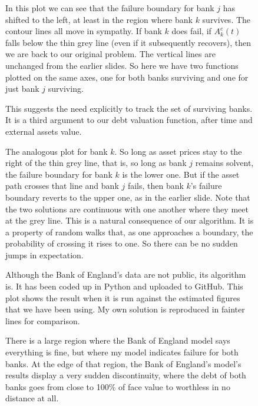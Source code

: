 \documentclass[a4paper,11pt]{article}
\newcommand{\ass}[2]{A^{e}_{#1}(#2)}
\begin{document}
  \begin{figure}[H]
    \begin{center}
    \end{center}
    \ttfamily
    In this plot we can see that the failure boundary for bank $j$ has shifted to the left, at least in the region where bank $k$ survives.
    The contour lines all move in sympathy.
    If bank $k$ does fail, if $\ass{k}{t}$ falls below the thin grey line (even if it subsequently recovers), then we are back to our original problem.
    The vertical lines are unchanged from the earlier slides.
    So here we have two functions plotted on the same axes, one for both banks surviving and one for just bank $j$ surviving.

    This suggests the need explicitly to track the set of surviving banks.
    It is a third argument to our debt valuation function, after time and external assets value.
  \end{figure}
  \begin{figure}[H]
    \begin{center}
    \end{center}
    \ttfamily
    The analogous plot for bank $k$. So long as asset prices stay to the right of the thin grey line,
    that is, so long as bank $j$ remains solvent,
    the failure boundary for bank $k$ is the lower one.
    But if the asset path crosses that line and bank $j$ fails, then bank $k$'s failure boundary reverts to the upper one, as in the earlier slide.
    Note that the two solutions are continuous with one another where they meet at the grey line.
    This is a natural consequence of our algorithm. It is a property of random walks that,
    as one approaches a boundary, the probability of crossing it rises to one.
    So there can be no sudden jumps in expectation.
  \end{figure}
  \begin{figure}[H]
    \begin{center}
    \end{center}
    \ttfamily
    Although the Bank of England's data are not public, its algorithm is.
    It has been coded up in Python and uploaded to GitHub.
    This plot shows the result when it is run against the estimated figures that we have been using.
    My own solution is reproduced in fainter lines for comparison.

    There is a large region where the Bank of England model says everything is fine, but where my model indicates failure for both banks.
    At the edge of that region, the Bank of England's model's results display a very sudden discontinuity,
    where the debt of both banks goes from close to 100\% of face value to worthless in no distance at all.
  \end{figure}
\end{document}
